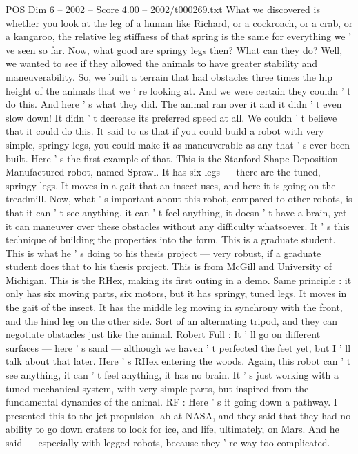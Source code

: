 \begin{textsample}{POS Dim 6 – 2002 – Score 4.00 – 2002/t000269.txt}
What we discovered is whether you look at the leg of a human like Richard, or a cockroach, or a crab, or a kangaroo, the relative leg stiffness of that spring is the same for everything we ' ve seen so far.
Now, what good are springy legs then?
What can they do?
Well, we wanted to see if they allowed the animals to have greater stability and maneuverability.
So, we built a terrain that had obstacles three times the hip height of the animals that we ' re looking at.
And we were certain they couldn ' t do this.
And here ' s what they did.
The animal ran over it and it didn ' t even slow down!
It didn ' t decrease its preferred speed at all.
We couldn ' t believe that it could do this.
It said to us that if you could build a robot with very simple, springy legs, you could make it as maneuverable as any that ' s ever been built.
Here ' s the first example of that.
This is the Stanford Shape Deposition Manufactured robot, named Sprawl.
It has six legs — there are the tuned, springy legs.
It moves in a gait that an insect uses, and here it is going on the treadmill.
Now, what ' s important about this robot, compared to other robots, is that it can ' t see anything, it can ' t feel anything, it doesn ' t have a brain, yet it can maneuver over these obstacles without any difficulty whatsoever.
It ' s this technique of building the properties into the form.
This is a graduate student.
This is what he ' s doing to his thesis project — very robust, if a graduate student does that to his thesis project.
This is from McGill and University of Michigan.
This is the RHex, making its first outing in a demo.
Same principle : it only has six moving parts, six motors, but it has springy, tuned legs.
It moves in the gait of the insect.
It has the middle leg moving in synchrony with the front, and the hind leg on the other side.
Sort of an alternating tripod, and they can negotiate obstacles just like the animal.
Robert Full : It ' ll go on different surfaces — here ' s sand — although we haven ' t perfected the feet yet, but I ' ll talk about that later.
Here ' s RHex entering the woods.
Again, this robot can ' t see anything, it can ' t feel anything, it has no brain.
It ' s just working with a tuned mechanical system, with very simple parts, but inspired from the fundamental dynamics of the animal.
RF : Here ' s it going down a pathway.
I presented this to the jet propulsion lab at NASA, and they said that they had no ability to go down craters to look for ice, and life, ultimately, on Mars.
And he said — especially with legged-robots, because they ' re way too complicated.

\end{textsample}
